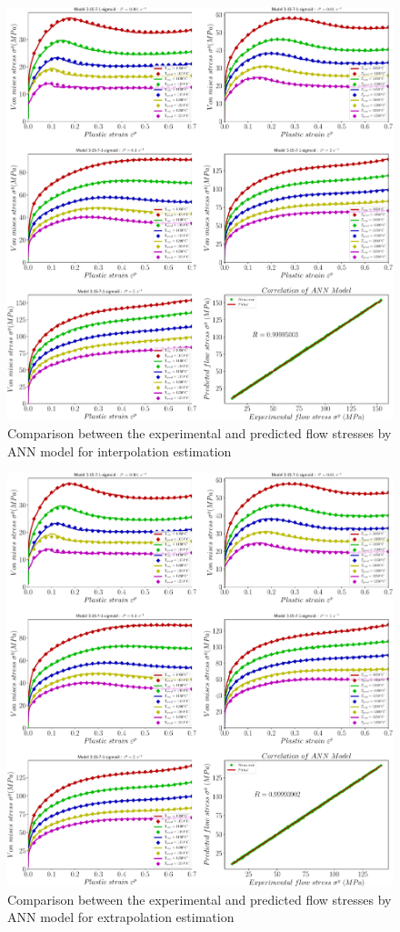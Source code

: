 \documentclass[twoside,english,1p,final,sort&compress]{elsarticle}
\theoremstyle{plain}
\begin{document}
\begin{figure}[!ht]
\centering
\includegraphics[width=1.02\columnwidth]
{newFigures/iCorrelationANN}
\caption{Comparison between the experimental and predicted flow stresses by ANN model for interpolation estimation}
\label{fig:iCorrelationANN}
\end{figure}
\begin{figure}[!ht]
\centering
\includegraphics[width=1.02\columnwidth]
{newFigures/eCorrelationANN}
\caption{Comparison between the experimental and predicted flow stresses by ANN model for extrapolation estimation}
\label{fig:eCorrelationANN}
\end{figure}
\end{document}
